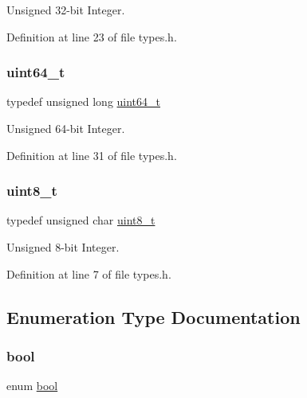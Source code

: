 Unsigned 32-\/bit Integer. 



Definition at line 23 of file types.\+h.

\mbox{\label{a00140_aa232ecf786a74ce5363c36c10798d2b1_aa232ecf786a74ce5363c36c10798d2b1}} 
\subsubsection{\texorpdfstring{uint64\+\_\+t}{uint64\_t}}
{\footnotesize\ttfamily typedef unsigned long \hyperlink{a00140_aa232ecf786a74ce5363c36c10798d2b1_aa232ecf786a74ce5363c36c10798d2b1}{uint64\+\_\+t}}



Unsigned 64-\/bit Integer. 



Definition at line 31 of file types.\+h.

\mbox{\label{a00140_aba7bc1797add20fe3efdf37ced1182c5_aba7bc1797add20fe3efdf37ced1182c5}} 
\subsubsection{\texorpdfstring{uint8\+\_\+t}{uint8\_t}}
{\footnotesize\ttfamily typedef unsigned char \hyperlink{a00140_aba7bc1797add20fe3efdf37ced1182c5_aba7bc1797add20fe3efdf37ced1182c5}{uint8\+\_\+t}}



Unsigned 8-\/bit Integer. 



Definition at line 7 of file types.\+h.



\subsection{Enumeration Type Documentation}
\mbox{\label{a00140_af6a258d8f3ee5206d682d799316314b1_af6a258d8f3ee5206d682d799316314b1}} 
\subsubsection{\texorpdfstring{bool}{bool}}
{\footnotesize\ttfamily enum \hyperlink{a00140_af6a258d8f3ee5206d682d799316314b1_af6a258d8f3ee5206d682d799316314b1}{bool}}



